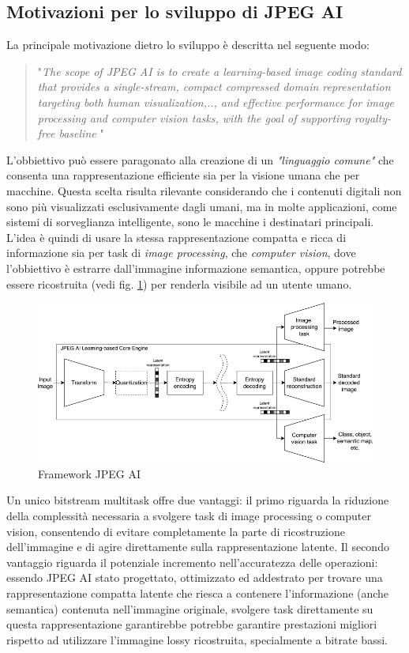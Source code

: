 \subsection{Motivazioni per lo sviluppo di JPEG AI}
La principale motivazione dietro lo sviluppo è descritta nel seguente modo:
\begin{quote}
    "\textit{The scope of JPEG AI is to create a learning-based image coding standard that provides a single-stream, compact compressed domain representation targeting both human visualization,.., and effective performance for image processing and computer vision tasks, with the goal of supporting royalty-free baseline} \cite{ascenso2023jpegAI}"
\end{quote} L'obbiettivo può essere paragonato alla creazione di un \textit{"linguaggio comune"} che consenta una rappresentazione efficiente sia per la visione umana che per macchine. Questa scelta risulta rilevante considerando che i contenuti digitali non sono più visualizzati esclusivamente dagli umani, ma in molte applicazioni, come sistemi di sorveglianza intelligente, sono le macchine i destinatari principali.
L'idea è quindi di usare la stessa rappresentazione compatta e ricca di informazione sia per task di \textit{image processing}, che \textit{computer vision}, dove l'obbiettivo è estrarre dall'immagine informazione semantica, oppure potrebbe essere ricostruita (vedi fig. \ref{fig:fig:jpeg_frw}) per renderla visibile ad un utente umano.
\begin{figure}
    \centering
    \includegraphics[width=1\linewidth]{img/JPEG AI.png}
    \caption{Framework JPEG AI}
    \label{fig:fig:jpeg_frw}
\end{figure}
Un unico bitstream multitask offre due vantaggi: il primo riguarda la riduzione della complessità necessaria a svolgere task di image processing o computer vision, consentendo di evitare completamente la parte di ricostruzione dell'immagine e di agire direttamente sulla rappresentazione latente. Il secondo vantaggio riguarda il potenziale incremento nell'accuratezza delle operazioni: essendo JPEG AI stato progettato, ottimizzato ed addestrato per trovare una rappresentazione compatta latente che riesca a contenere l'informazione (anche semantica) contenuta nell'immagine originale, svolgere task direttamente su questa rappresentazione garantirebbe potrebbe garantire prestazioni migliori rispetto ad utilizzare l'immagine lossy ricostruita, specialmente a bitrate bassi.\\

